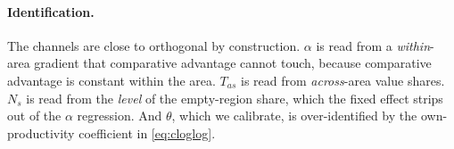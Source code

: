 \paragraph{Identification.} The channels are close to orthogonal by construction. $\alpha$ is
read from a \emph{within}-area gradient that comparative advantage cannot touch, because
comparative advantage is constant within the area. $T_{as}$ is read from \emph{across}-area
value shares. $N_{s}$ is read from the \emph{level} of the empty-region share, which the fixed
effect strips out of the $\alpha$ regression. And $\theta$, which we calibrate, is over-identified
by the own-productivity coefficient in \eqref{eq:cloglog}.
